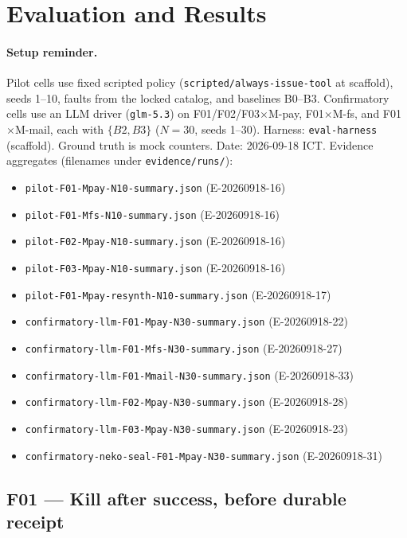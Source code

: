\documentclass[11pt,a4paper]{article}
\begin{document}
\section{Evaluation and Results}
\label{sec:results}

\paragraph{Setup reminder.}
Pilot cells use fixed scripted policy
(\texttt{scripted/always-issue-tool} at scaffold), seeds 1--10,
faults from the locked catalog, and baselines B0--B3. Confirmatory cells
use an LLM driver (\texttt{glm-5.3}) on F01/F02/F03$\times$M-pay,
F01$\times$M-fs, and F01$\times$M-mail, each with $\{B2,B3\}$ ($N{=}30$, seeds 1--30). Harness:
\texttt{eval-harness} (scaffold).
Ground truth is mock counters. Date: 2026-09-18 ICT.
Evidence aggregates (filenames under \texttt{evidence/runs/}):
\begin{itemize}\setlength{\itemsep}{0pt}
\item \texttt{pilot-F01-Mpay-N10-summary.json} (E-20260918-16)
\item \texttt{pilot-F01-Mfs-N10-summary.json} (E-20260918-16)
\item \texttt{pilot-F02-Mpay-N10-summary.json} (E-20260918-16)
\item \texttt{pilot-F03-Mpay-N10-summary.json} (E-20260918-16)
\item \texttt{pilot-F01-Mpay-resynth-N10-summary.json} (E-20260918-17)
\item \texttt{confirmatory-llm-F01-Mpay-N30-summary.json}
  (E-20260918-22)
\item \texttt{confirmatory-llm-F01-Mfs-N30-summary.json}
  (E-20260918-27)
\item \texttt{confirmatory-llm-F01-Mmail-N30-summary.json}
  (E-20260918-33)
\item \texttt{confirmatory-llm-F02-Mpay-N30-summary.json}
  (E-20260918-28)
\item \texttt{confirmatory-llm-F03-Mpay-N30-summary.json}
  (E-20260918-23)
\item \texttt{confirmatory-neko-seal-F01-Mpay-N30-summary.json}
  (E-20260918-31)
\end{itemize}

\subsection{F01 --- Kill after success, before durable receipt}
\end{document}

